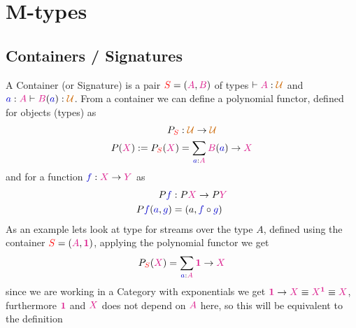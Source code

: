 \documentclass[twoside,11pt,openright]{report}
\newcommand*{\term}[1]{\textcolor{blue!80!black}{#1}}
\newcommand*{\type}[1]{\textcolor{magenta!90!black}{#1}}
\newcommand*{\container}[1]{\textcolor{red}{#1}}
\newcommand*{\universe}[1]{\textcolor{orange!80!black}{#1}}
\newcommand*{\unit}{\type{\textbf{1}}}
\begin{document}



\chapter{M-types}
\label{ch:m-types}

\section{Containers / Signatures}
A Container (or Signature) is a pair \(\container{S} = (\type{A},\type{B})\) of types \(\vdash \type{A} : \universe{\mathcal{U}}\) and \(\term{a} : \type{A} \vdash \type{B}(\term{a}) : \universe{\mathcal{U}}\). From a container we can define a polynomial functor, defined for objects (types) as
\begin{equation}
  \begin{aligned}
    P_{\container{S}} &: \universe{\mathcal{U}} \rightarrow \universe{\mathcal{U}} \\
    P(\type{X}) := P_{\container{S}}(\type{X}) &= \sum_{\term{a} : \type{A}} \type{B}(\term{a}) \rightarrow \type{X}
  \end{aligned}
\end{equation}
and for a function \(\term{f} : \type{X} \rightarrow \type{Y}\) as
\begin{equation}
  \begin{aligned}
    P\term{f} &: P\type{X} \rightarrow P\type{Y} \\
    P\term{f}(\term{a},\term{g}) &= (a, \term{f} \circ \term{g})
  \end{aligned}
\end{equation}
As an example lets look at type for streams over the type \(A\), defined using the container \(\container{S} = (\type{A},\unit)\), applying the polynomial functor we get
\begin{equation}
  P_{\container{S}}(\type{X}) = \sum_{\term{a} : \type{A}} \unit \rightarrow \type{X}
\end{equation}
since we are working in a Category with exponentials we get \(\unit \rightarrow \type{X} \equiv \type{X}^{\unit} \equiv \type{X}\), furthermore \(\unit\) and \(\type{X}\) does not depend on \(\type{A}\) here, so this will be equivalent to the definition
\end{document}

